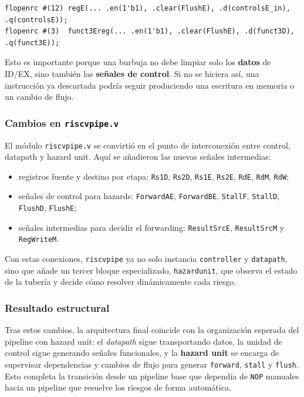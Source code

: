 \documentclass[11pt,a4paper]{article}
\begin{document}
\begin{lstlisting}
flopenrc #(12) regE(... .en(1'b1), .clear(FlushE), .d(controlsE_in), .q(controlsE));
flopenrc #(3)  funct3Ereg(... .en(1'b1), .clear(FlushE), .d(funct3D), .q(funct3E));
\end{lstlisting}

Esto es importante porque una burbuja no debe limpiar solo los \textbf{datos} de ID/EX,
sino también las \textbf{señales de control}. Si no se hiciera así, una instrucción ya
descartada podría seguir produciendo una escritura en memoria o un cambio de flujo.

\subsubsection{Cambios en \texttt{riscvpipe.v}}

El módulo \texttt{riscvpipe.v} se convirtió en el punto de interconexión entre control,
datapath y hazard unit. Aquí se añadieron las nuevas señales intermedias:

\begin{itemize}
	\item registros fuente y destino por etapa:
	      \texttt{Rs1D}, \texttt{Rs2D}, \texttt{Rs1E}, \texttt{Rs2E}, \texttt{RdE},
	      \texttt{RdM}, \texttt{RdW};
	\item señales de control para hazards:
	      \texttt{ForwardAE}, \texttt{ForwardBE}, \texttt{StallF}, \texttt{StallD},
	      \texttt{FlushD}, \texttt{FlushE};
	\item señales intermedias para decidir el forwarding:
	      \texttt{ResultSrcE}, \texttt{ResultSrcM} y \texttt{RegWriteM}.
\end{itemize}

Con estas conexiones, \texttt{riscvpipe} ya no solo instancia \texttt{controller} y
\texttt{datapath}, sino que añade un tercer bloque especializado, \texttt{hazardunit},
que observa el estado de la tubería y decide cómo resolver dinámicamente cada riesgo.

\subsubsection{Resultado estructural}

Tras estos cambios, la arquitectura final coincide con la organización esperada del
pipeline con hazard unit: el \textit{datapath} sigue transportando datos, la unidad de
control sigue generando señales funcionales, y la \textbf{hazard unit} se encarga de
supervisar dependencias y cambios de flujo para generar \texttt{forward}, \texttt{stall}
y \texttt{flush}. Esto completa la transición desde un pipeline base que dependía de
\texttt{NOP} manuales hacia un pipeline que resuelve los riesgos de forma automática.
\end{document}
